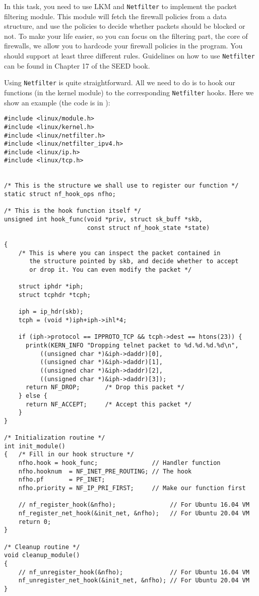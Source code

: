 In this task, you need to use LKM and {\tt Netfilter} to implement
the packet filtering module.  This module will fetch 
the firewall policies from a data structure, and use the 
policies to decide whether packets should be blocked or not.
To make your life easier, so you can focus on the filtering part, 
the core of firewalls, we allow you to hardcode your firewall policies 
in the program. You should support at least three different 
rules. Guidelines on how to use \texttt{Netfilter} can be 
found in Chapter 17 of the SEED book.


Using {\tt Netfilter} is quite straightforward. All we need to do
is to hook our functions (in the kernel module) to the corresponding
{\tt Netfilter} hooks. Here we show an example (the code is in
):


\begin{lstlisting}
#include <linux/module.h>
#include <linux/kernel.h>
#include <linux/netfilter.h>
#include <linux/netfilter_ipv4.h>
#include <linux/ip.h>
#include <linux/tcp.h>


/* This is the structure we shall use to register our function */
static struct nf_hook_ops nfho;

/* This is the hook function itself */
unsigned int hook_func(void *priv, struct sk_buff *skb, 
                       const struct nf_hook_state *state)

{
    /* This is where you can inspect the packet contained in
       the structure pointed by skb, and decide whether to accept 
       or drop it. You can even modify the packet */
 
    struct iphdr *iph;
    struct tcphdr *tcph;
    
    iph = ip_hdr(skb);
    tcph = (void *)iph+iph->ihl*4;
 
    if (iph->protocol == IPPROTO_TCP && tcph->dest == htons(23)) {
      printk(KERN_INFO "Dropping telnet packet to %d.%d.%d.%d\n",
          ((unsigned char *)&iph->daddr)[0],
          ((unsigned char *)&iph->daddr)[1],
          ((unsigned char *)&iph->daddr)[2],
          ((unsigned char *)&iph->daddr)[3]);
      return NF_DROP;       /* Drop this packet */
    } else {
      return NF_ACCEPT;     /* Accept this packet */
    }
}

/* Initialization routine */
int init_module()
{   /* Fill in our hook structure */
    nfho.hook = hook_func;               // Handler function 
    nfho.hooknum  = NF_INET_PRE_ROUTING; // The hook 
    nfho.pf       = PF_INET;
    nfho.priority = NF_IP_PRI_FIRST;     // Make our function first 

    // nf_register_hook(&nfho);               // For Ubuntu 16.04 VM
    nf_register_net_hook(&init_net, &nfho);   // For Ubuntu 20.04 VM
    return 0;
}

/* Cleanup routine */
void cleanup_module()
{
    // nf_unregister_hook(&nfho);             // For Ubuntu 16.04 VM
    nf_unregister_net_hook(&init_net, &nfho); // For Ubuntu 20.04 VM
}
\end{lstlisting}


